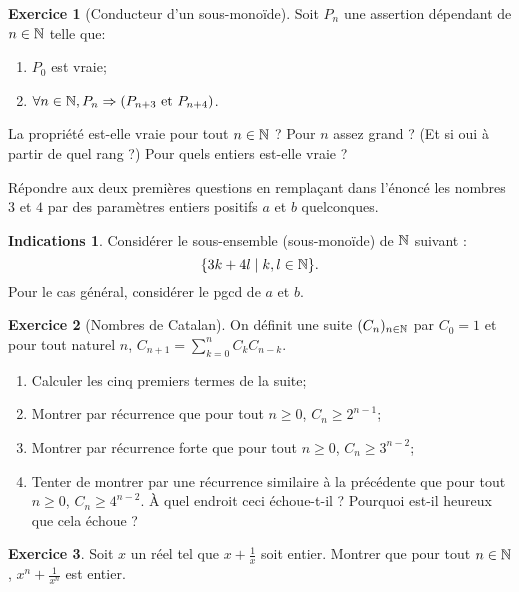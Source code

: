 \documentclass[11pt,a4paper]{article}
\theoremstyle{definition}
\newtheorem{exo}{Exercice}
\newtheorem{ind}{Indications}
\newcommand{\exercice}[1]{} \newcommand{\finexercice}{}
\newcommand{\enonce}{\begin{exo}} \newcommand{\finenonce}{\end{exo}}
\newcommand{\indication}{\begin{ind}} \newcommand{\finindication}{\end{ind}}
\newcommand{\noindication}{\stepcounter{ind}}
\newcommand{\nocorrection}{\stepcounter{cor}}
\begin{document}
\noindication

\nocorrection

\finexercice
\exercice{7039, megy, 2016/11/20}

\enonce[Conducteur d'un sous-monoïde]
Soit $P_n$ une assertion dépendant de $n \in \mathbb{N}$ telle que:
\begin{enumerate}
\item $P_0$ est vraie;
\item $\forall n \in \mathbb{N}, P_n \Rightarrow 
(P_{n+3} \text{ et } P_{n+4})$.
\end{enumerate}
La propriété est-elle vraie pour tout $n \in \mathbb{N}$ ? Pour $n$ assez grand  ? (Et si oui à partir de quel rang ?) Pour quels entiers est-elle vraie ?

Répondre aux deux premières questions en remplaçant dans l'énoncé les nombres $3$ et $4$ par des paramètres entiers positifs $a$ et $b$ quelconques.
\finenonce

\indication
Considérer le sous-ensemble (sous-monoïde) de $\mathbb{N}$ suivant :
\[ \{3k+4l\mid k,l \in \mathbb{N}\}.\]
Pour le cas général, considérer le pgcd de $a$ et $b$.
\finindication

\nocorrection

\finexercice
\exercice{7040, megy, 2016/11/20}

\enonce[Nombres de Catalan]
On définit une suite $(C_n)_{n\in\mathbb{N}}$ par $C_0=1$ et pour tout naturel $n$,  
$C_{n+1} = \sum_{k=0}^{n}C_kC_{n-k}$.
\begin{enumerate}
\item Calculer les cinq premiers termes de la suite;
\item Montrer par récurrence que pour tout $n\geq 0$,  $C_n \geq 2^{n-1}$;
\item Montrer par récurrence forte que pour tout $n\geq 0$,  $C_n \geq 3^{n-2}$;
\item Tenter de montrer par une récurrence similaire à la précédente que pour tout $n\geq 0$,  $C_n \geq 4^{n-2}$. À quel endroit ceci échoue-t-il ? Pourquoi est-il heureux que cela échoue ?
\end{enumerate}
\finenonce

\noindication

\nocorrection

\finexercice
\exercice{7041, megy, 2016/11/20}

\enonce 
Soit $x$ un réel tel que $x+\frac{1}{x}$ soit entier. Montrer que pour tout $n\in \mathbb{N}$, $x^n+\frac{1}{x^n}$ est entier.
\finenonce
\end{document}
